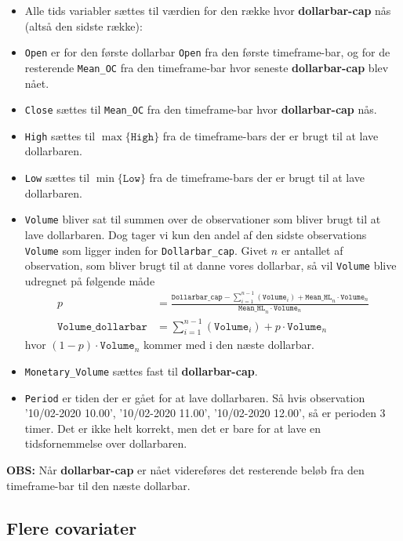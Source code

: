 \documentclass[a4paper,danish,12pt]{article}
\begin{document}
\begin{itemize}
\item Alle tids variabler sættes til værdien for den række hvor \textbf{dollarbar-cap} nås (altså den sidste række):
\item \texttt{Open} er for den første dollarbar \texttt{Open} fra den første timeframe-bar, og for de resterende \texttt{Mean\_OC} fra den timeframe-bar hvor seneste \textbf{dollarbar-cap} blev nået.
\item \texttt{Close} sættes til \texttt{Mean\_OC} fra den timeframe-bar hvor \textbf{dollarbar-cap} nås.
\item \texttt{High} sættes til $\max\{ \texttt{High} \}$ fra de timeframe-bars der er brugt til at lave dollarbaren.
\item \texttt{Low} sættes til $\min\{ \texttt{Low} \}$ fra de timeframe-bars der er brugt til at lave dollarbaren.
\item \texttt{Volume} bliver sat til summen over de observationer som bliver brugt til at lave dollarbaren. Dog tager vi kun den andel af den sidste observations \texttt{Volume} som ligger inden for \texttt{Dollarbar\_cap}. Givet $n$ er antallet af observation, som bliver brugt til at danne vores dollarbar, så vil \texttt{Volume} blive udregnet på følgende måde
\begin{align*}
	p &= \frac{\texttt{Dollarbar\_cap} - \sum_{i=1}^{n-1}\left(\texttt{Volume}_i\right) + \texttt{Mean\_HL}_n\cdot\texttt{Volume}_n}{\texttt{Mean\_HL}_n\cdot\texttt{Volume}_n}\\
	\texttt{Volume\_dollarbar}&=\sum_{i=1}^{n-1}\left(\texttt{Volume}_i\right)+p\cdot\texttt{Volume}_n
\end{align*}
hvor $(1-p)\cdot\texttt{Volume}_n$ kommer med i den næste dollarbar.
\item \texttt{Monetary\_Volume} sættes fast til \textbf{dollarbar-cap}.
\item \texttt{Period} er tiden der er gået for at lave dollarbaren. Så hvis observation '10/02-2020 10.00', '10/02-2020 11.00', '10/02-2020 12.00', så er perioden 3 timer. Det er ikke helt korrekt, men det er bare for at lave en tidsfornemmelse over dollarbaren.
\end{itemize}
\textbf{OBS:} Når \textbf{dollarbar-cap} er nået videreføres det resterende beløb fra den timeframe-bar til den næste dollarbar.

\subsection*{Flere covariater}
\end{document}
